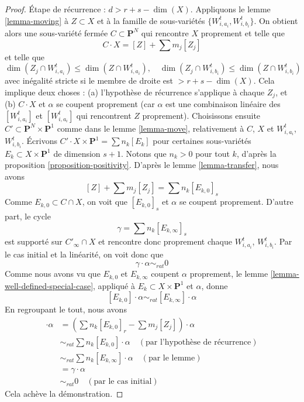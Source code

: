 \begin{proof}
\medskip\noindent
Étape de récurrence : $d >  r + s - \dim(X)$. Appliquons le
lemme \ref{lemma-moving} à $Z \subset X$ et à
la famille de sous-variétés $\{W_{i, a_i}^t, W_{i, b_i}^t\}$. On obtient alors une
sous-variété fermée $C \subset \mathbf{P}^N$ qui rencontre $X$
proprement et telle que
$$
C \cdot X = [Z] + \sum m_j [Z_j]
$$
et telle que
$$
\dim(Z_j \cap W_{i, a_i}^t) \leq \dim(Z \cap W_{i, a_i}^t),\quad
\dim(Z_j \cap W_{i, b_i}^t) \leq \dim(Z \cap W_{i, b_i}^t)
$$
avec inégalité stricte si le membre de droite est $> r + s - \dim(X)$.
Cela implique deux choses : (a) l'hypothèse de récurrence s'applique à
chaque $Z_j$, et (b) $C \cdot X$ et $\alpha$ se coupent proprement (car
$\alpha$ est une combinaison linéaire des $[W_{i, a_i}^t]$ et
$[W_{i, a_i}^t]$ qui rencontrent $Z$ proprement).
Choisissons ensuite $C' \subset \mathbf{P}^N \times \mathbf{P}^1$
comme dans le lemme \ref{lemma-move}, relativement à $C$, $X$ et
$W_{i, a_i}^t$, $W_{i, b_i}^t$.
Écrivons $C' \cdot X \times \mathbf{P}^1 = \sum n_k [E_k]$ pour
certaines sous-variétés $E_k \subset X \times \mathbf{P}^1$ de
dimension $s + 1$. Notons que $n_k > 0$ pour tout $k$, d'après la
proposition \ref{proposition-positivity}.
D'après le lemme \ref{lemma-transfer}, nous avons
$$
[Z] + \sum m_j [Z_j] = \sum n_k[E_{k, 0}]_s
$$
Comme $E_{k, 0} \subset C \cap X$, on voit que $[E_{k, 0}]_s$ et $\alpha$
se coupent proprement. D'autre part, le cycle
$$
\gamma = \sum n_k[E_{k, \infty}]_s
$$
est supporté sur $C'_\infty \cap X$ et
rencontre donc proprement chaque $W_{i, a_i}^t$, $W_{i, b_i}^t$.
Par le cas initial et la linéarité, on voit donc que
$$
\gamma \cdot \alpha \sim_{rat} 0
$$
Comme nous avons vu que $E_{k, 0}$ et $E_{k, \infty}$
coupent $\alpha$ proprement, le lemme \ref{lemma-well-defined-special-case},
appliqué à $E_k \subset X \times \mathbf{P}^1$ et $\alpha$, donne
$$
[E_{k, 0}] \cdot \alpha \sim_{rat} [E_{k, \infty}] \cdot \alpha
$$
En regroupant le tout, nous avons
\begin{align*}
[Z] \cdot \alpha
& =
(\sum n_k[E_{k, 0}]_r - \sum m_j[Z_j]) \cdot \alpha \\
& \sim_{rat}
\sum n_k [E_{k, 0}] \cdot \alpha \quad (\text{par l'hypothèse de récurrence})\\
& \sim_{rat}
\sum n_k [E_{k, \infty}] \cdot \alpha \quad (\text{par le lemme})\\
& =
\gamma \cdot \alpha \\
& \sim_{rat}
0 \quad (\text{par le cas initial})
\end{align*}
Cela achève la démonstration.
\end{proof}

